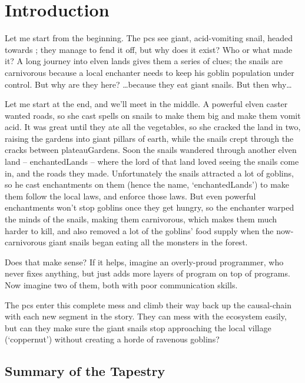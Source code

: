 \enchantedMap[t]

\section{Introduction}

\begin{multicols}{2}

\noindent
Let me start from the beginning.
The \glspl{pc} see giant, acid-vomiting snail, headed towards ; they manage to fend it off, but why does it exist?
Who or what made it?
A long journey into elven lands gives them a series of clues; the snails are carnivorous because a local enchanter needs to keep his goblin population under control.
But why are they here?
\ldots because they eat giant snails.
But then why\ldots

Let me start at the end, and we'll meet in the middle.
A powerful elven caster wanted roads, so she cast spells on snails to make them big and make them vomit acid.
It was great until they ate all the vegetables, so she cracked the land in two, raising the gardens into giant pillars of earth, while the snails crept through the cracks between \gls{plateauGardens}.
Soon the snails wandered through another elven land -- \gls{enchantedLands} -- where the lord of that land loved seeing the snails come in, and the roads they made.
Unfortunately the snails attracted a lot of goblins, so he cast enchantments on them (hence the name, `\gls{enchantedLands}') to make them follow the local laws, and enforce those laws.
But even powerful enchantments won't stop goblins once they get hungry, so the enchanter warped the minds of the snails, making them carnivorous, which makes them much harder to kill, and also removed a lot of the goblins' food supply when the now-carnivorous giant snails began eating all the \glspl{monster} in the forest.

Does that make sense?
If it helps, imagine an overly-proud programmer, who never fixes anything, but just adds more layers of program on top of programs.
Now imagine two of them, both with poor communication skills.

The \glspl{pc} enter this complete mess and climb their way back up the causal-chain with each new \gls{segment} in the story.
They can mess with the ecosystem easily, but can they make sure the giant snails stop approaching the local \gls{village} (`\gls{coppernut}') without creating a horde of ravenous goblins?

\subsection{Summary of the Tapestry}


\end{multicols}
